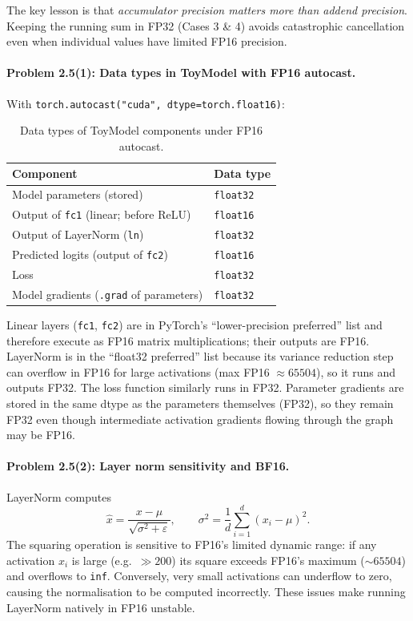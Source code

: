 \documentclass[11pt]{article}
\begin{document}
The key lesson is that \emph{accumulator precision matters more than addend precision}.
Keeping the running sum in FP32 (Cases 3 \& 4) avoids catastrophic cancellation even
when individual values have limited FP16 precision.

\paragraph{Problem 2.5(1): Data types in ToyModel with FP16 autocast.}

With \texttt{torch.autocast("cuda", dtype=torch.float16)}:

\begin{table}[H]
\centering
\caption{Data types of ToyModel components under FP16 autocast.}
\begin{tabular}{ll}
\toprule
Component & Data type \\
\midrule
Model parameters (stored) & \texttt{float32} \\
Output of \texttt{fc1} (linear; before ReLU) & \texttt{float16} \\
Output of LayerNorm (\texttt{ln}) & \texttt{float32} \\
Predicted logits (output of \texttt{fc2}) & \texttt{float16} \\
Loss & \texttt{float32} \\
Model gradients (\texttt{.grad} of parameters) & \texttt{float32} \\
\bottomrule
\end{tabular}
\end{table}

Linear layers (\texttt{fc1}, \texttt{fc2}) are in PyTorch's ``lower-precision preferred''
list and therefore execute as FP16 matrix multiplications; their outputs are FP16.
LayerNorm is in the ``float32 preferred'' list because its variance reduction step
can overflow in FP16 for large activations (max FP16 $\approx 65504$), so it runs and
outputs FP32. The loss function similarly runs in FP32. Parameter gradients are stored
in the same dtype as the parameters themselves (FP32), so they remain FP32 even though
intermediate activation gradients flowing through the graph may be FP16.

\paragraph{Problem 2.5(2): Layer norm sensitivity and BF16.}

LayerNorm computes
\[
  \hat{x} = \frac{x - \mu}{\sqrt{\sigma^2 + \varepsilon}}, \qquad
  \sigma^2 = \frac{1}{d}\sum_{i=1}^d (x_i - \mu)^2.
\]
The squaring operation is sensitive to FP16's limited dynamic range: if any activation
$x_i$ is large (e.g.\ $\gg 200$) its square exceeds FP16's maximum (${\sim}65504$) and
overflows to \texttt{inf}. Conversely, very small activations can underflow to zero,
causing the normalisation to be computed incorrectly. These issues make running
LayerNorm natively in FP16 unstable.
\end{document}
